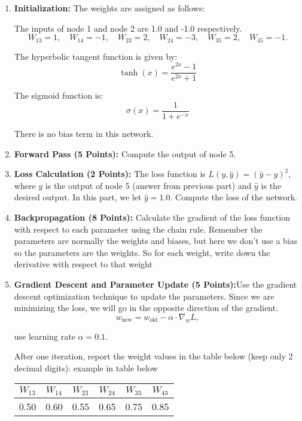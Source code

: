 \begin{enumerate}
\item \textbf{Initialization: } 
The weights are assigned as follows:


The inputs of node 1 and node 2 are 1.0 and -1.0 respectively.
\[
W_{13} = 1, \quad W_{14} = -1, \quad W_{23} = 2, \quad W_{24} = -3, \quad W_{35} = 2, \quad W_{45} = -1.
\]

The hyperbolic tangent function is given by:
\[
\tanh(x) = \frac{e^{2x} - 1}{e^{2x} + 1}
\]

The sigmoid function is:
\[
\sigma(x) = \frac{1}{1 + e^{-x}}
\]

There is no bias term in this network.


    \item \textbf{Forward Pass (5 Points):} Compute the output of node 5.
    \item \textbf{Loss Calculation (2 Points):} The loss function is $L(y, \hat{y}) = (\hat{y} - y)^2$, where $y$ is the output of node 5 (answer from previous part) and $\hat{y}$ is the desired output. In this part, we let $\hat{y} = 1.0$. Compute the loss of the network.
    \item \textbf{Backpropagation (8 Points):} Calculate the gradient of the loss function with respect to each parameter
using the chain rule. Remember the parameters are normally the weights and biases, but here we
don’t use a bias so the parameters are the weights. So for each weight, write down the derivative with
respect to that weight
    \item \textbf{Gradient Descent and Parameter Update (5 Points):}Use the gradient descent optimization
technique to update the parameters. Since we are minimizing the loss, we will go in the opposite
direction of the gradient.
    \[
    w_{\text{new}} = w_{\text{old}} - \alpha \cdot \nabla_w L,
    \]
    
    use learning rate $\alpha = 0.1$. 
    
    After one iteration, report the weight values in the table below (keep only 2 decimal digits): example
in table below
    \begin{center}
        \begin{tabular}{|c|c|c|c|c|c|}
        \hline
        $W_{13}$ & $W_{14}$ & $W_{23}$ & $W_{24}$ & $W_{35}$ & $W_{45}$ \\ \hline
        0.50    & 0.60    & 0.55    & 0.65    & 0.75    & 0.85    \\ \hline
        \end{tabular}
    \end{center}
\end{enumerate}

